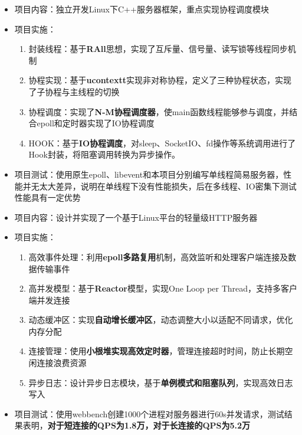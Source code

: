 \documentclass{resume}
\begin{document}

\begin{itemize}
  \item 项目内容：独立开发Linux下C++服务器框架，重点实现协程调度模块
  \item 项目实施：
    \begin{enumerate}[label=\arabic*. ]
      \item 封装线程：基于\textbf{RAll}思想，实现了互斥量、信号量、读写锁等线程同步机制
      \item 协程实现：基于\textbf{ucontextt}实现非对称协程，定义了三种协程状态，实现了子协程与主线程的切换
      \item 协程调度：实现了\textbf{N-M协程调度器}，使main函数线程能够参与调度，并结合epoll和定时器实现了IO协程调度
      \item HOOK：基于\textbf{IO协程调度}，对sleep、SocketIO、fd操作等系统调用进行了Hook封装，将阻塞调用转换为异步操作。
    \end{enumerate}
  \item 项目测试：使用原生epoll、libevent和本项目分别编写单线程简易服务器，性能并无太大差异，说明在单线程下没有性能损失，后在多线程、IO密集下测试性能具有一定优势
\end{itemize}


\begin{itemize}
  \item 项目内容：设计并实现了一个基于Linux平台的轻量级HTTP服务器
  \item 项目实施：
    \begin{enumerate}[label=\arabic*. ]
      \item 高效事件处理：利用\textbf{epoll多路复用}机制，高效监听和处理客户端连接及数据传输事件
      \item 高并发模型：基于\textbf{Reactor}模型，实现One Loop per Thread，支持多客户端并发连接
      \item 动态缓冲区：实现\textbf{自动增长缓冲区}，动态调整大小以适配不同请求，优化内存分配
      \item 连接管理：使用\textbf{小根堆实现高效定时器}，管理连接超时时间，防止长期空闲连接浪费资源
      \item 异步日志：设计异步日志模块，基于\textbf{单例模式和阻塞队列}，实现高效日志写入
    \end{enumerate}
   \item 项目测试：使用webbench创建1000个进程对服务器进行60s并发请求，测试结果表明，\textbf{对于短连接的QPS为1.8万，对于长连接的QPS为5.2万}
\end{itemize}
\end{document}
